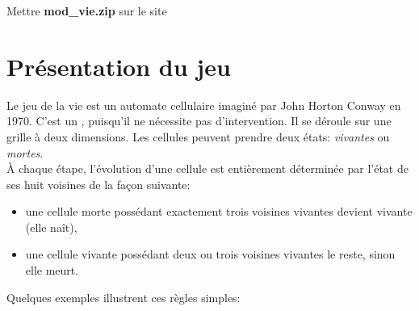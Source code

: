 \documentclass[a4paper,11pt]{article}
\begin{document}
\begin{Form}
\begin{commentprof}
Mettre \textbf{mod\_vie.zip} sur le site
\end{commentprof}
\section{Présentation du jeu}
Le jeu de la vie est un automate cellulaire imaginé par John Horton Conway en 1970. C'est un , puisqu'il ne nécessite pas d'intervention. Il se déroule sur une grille à deux dimensions. Les cellules peuvent prendre deux états: \emph{vivantes} ou \emph{mortes}.\\
À chaque étape, l’évolution d’une cellule est entièrement déterminée par l’état de ses huit voisines de la façon suivante:
\begin{itemize}
\item une cellule morte possédant exactement trois voisines vivantes devient vivante (elle naît),
\item une cellule vivante possédant deux ou trois voisines vivantes le reste, sinon elle meurt.
\end{itemize}
Quelques exemples illustrent ces règles simples:
\begin{center}
\end{center}
\begin{center}
\end{center}
\begin{center}
\end{center}

\end{Form}
\end{document}
